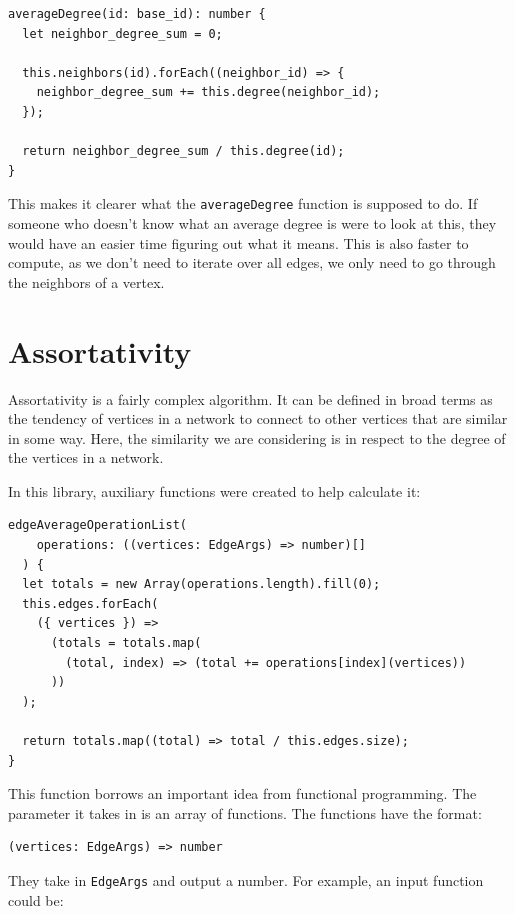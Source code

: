 \begin{verbatim}
averageDegree(id: base_id): number {
  let neighbor_degree_sum = 0;

  this.neighbors(id).forEach((neighbor_id) => {
    neighbor_degree_sum += this.degree(neighbor_id);
  });

  return neighbor_degree_sum / this.degree(id);
}
\end{verbatim}

This makes it clearer what the \texttt{averageDegree} function is supposed to do.
If someone who doesn't know what an average degree is were to look at this,
they would have an easier time figuring out what it means.
This is also faster to compute, as we don't need to iterate over all edges,
we only need to go through the neighbors of a vertex.

\section{Assortativity}

Assortativity is a fairly complex algorithm.
It can be defined in broad terms as the tendency of
vertices in a network to connect to other vertices that
are similar in some way.
Here, the similarity we are considering is in respect to
the degree of the vertices in a network.

In this library, auxiliary functions were created to help calculate it:

\begin{verbatim}
edgeAverageOperationList(
    operations: ((vertices: EdgeArgs) => number)[]
  ) {
  let totals = new Array(operations.length).fill(0);
  this.edges.forEach(
    ({ vertices }) =>
      (totals = totals.map(
        (total, index) => (total += operations[index](vertices))
      ))
  );

  return totals.map((total) => total / this.edges.size);
}
\end{verbatim}

This function borrows an important idea from functional programming.
The parameter it takes in is an array of functions.
The functions have the format:

\begin{verbatim}
(vertices: EdgeArgs) => number
\end{verbatim}

They take in \texttt{EdgeArgs} and output a number.
For example, an input function could be:

